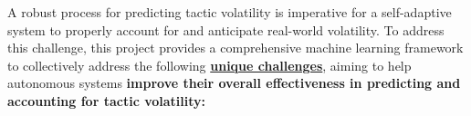 \documentclass[12pt]{article}
\newcommand{\todo}[1]{\textcolor{cyan}{\textbf{[#1]}}}
\begin{document}












\vspace{2mm}

A robust process for predicting tactic volatility is imperative for a self-adaptive system to properly account for and anticipate real-world volatility. To address this challenge, this project provides a comprehensive machine learning framework to collectively address the following \underline{\bf unique challenges}, aiming to help autonomous systems {\bf improve their overall effectiveness in predicting and accounting for tactic volatility:} 

% 



\end{document}
